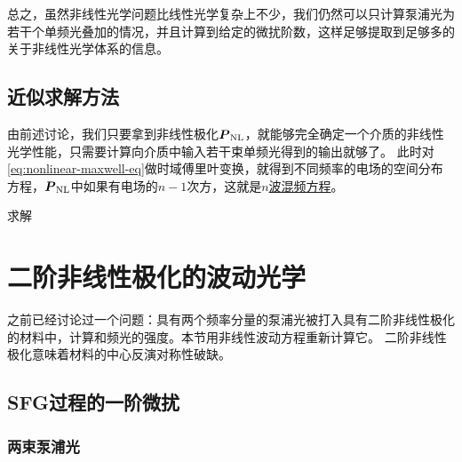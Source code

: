 \documentclass[UTF8, a4paper]{ctexart}
\newcommand{\concept}[1]{\underline{#1}}
\begin{document}
总之，虽然非线性光学问题比线性光学复杂上不少，我们仍然可以只计算泵浦光为若干个单频光叠加的情况，并且计算到给定的微扰阶数，这样足够提取到足够多的关于非线性光学体系的信息。

\subsection{近似求解方法}

由前述讨论，我们只要拿到非线性极化$\vb*{P}_\text{NL}$，就能够完全确定一个介质的非线性光学性能，只需要计算向介质中输入若干束单频光得到的输出就够了。
此时对\eqref{eq:nonlinear-maxwell-eq}做时域傅里叶变换，就得到不同频率的电场的空间分布方程，$\vb*{P}_\text{NL}$中如果有电场的$n-1$次方，这就是\concept{$n$波混频方程}。

求解

\section{二阶非线性极化的波动光学}

之前已经讨论过一个问题：具有两个频率分量的泵浦光被打入具有二阶非线性极化的材料中，计算和频光的强度。本节用非线性波动方程重新计算它。
二阶非线性极化意味着材料的中心反演对称性破缺。

\subsection{SFG过程的一阶微扰}

\subsubsection{两束泵浦光}
\end{document}
